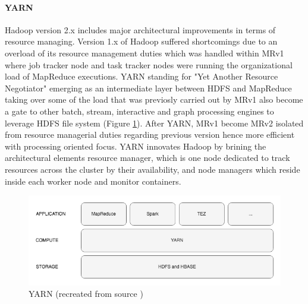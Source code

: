 \documentclass[review]{elsarticle}
\begin{document}
\paragraph{YARN}Hadoop version 2.x includes major architectural improvements in terms of resource managing. Version 1.x of Hadoop suffered shortcomings due to an overload of its resource management duties which was handled within MRv1 where job tracker node and task tracker nodes were running the organizational load of MapReduce executions. YARN standing for "Yet Another Resource Negotiator" emerging as an intermediate layer between HDFS and MapReduce taking over some of the load that was previosly carried out by MRv1 also become a gate to other batch, stream, interactive and graph processing engines to leverage HDFS file system (Figure \ref{fig:YARNoverview}). After YARN, MRv1 become MRv2 isolated from resource managerial duties regarding previous version hence more efficient with processing oriented focus. YARN innovates Hadoop by brining the architectural elements resource manager, which is one node dedicated to track resources across the cluster by their availability, and node managers which reside inside each worker node and monitor containers. 


\begin{figure}[h!]
	\includegraphics[width=\textwidth]{YARNoverview}
	\caption{YARN (recreated from source \cite{dean_mapreduce_2004})}
	\label{fig:YARNoverview}
	\centering
\end{figure}
\end{document}
